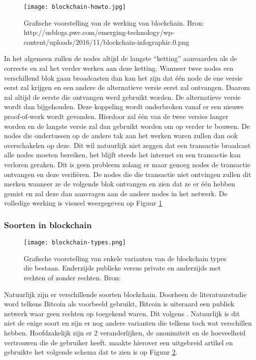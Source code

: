 \begin{figure}
	\texttt{[image: blockchain-howto.jpg]}
	\caption{Grafische voorstelling van de werking van blockchain. Bron: http://usblogs.pwc.com/emerging-technology/wp-content/uploads/2016/11/blockchain-infographic.0.png}
	\label{fig:blockchain-howto}
\end{figure}

In het algemeen zullen de nodes altijd de langste ``ketting'' aanvaarden als de correcte en zal het verder werken aan deze ketting. Wanneer twee nodes een verschillend blok gaan broadcasten dan kan het zijn dat één node de ene versie eerst zal krijgen en een andere de alternatieve versie eerst zal ontvangen. Daarom zal altijd de eerste die ontvangen werd gebruikt worden. De alternatieve versie wordt dan bijgehouden. Deze koppeling wordt onderbroken vanaf er een nieuwe proof-of-work wordt gevonden. Hierdoor zal één van de twee versies langer worden en de langste versie zal dan gebruikt worden om op verder te bouwen. De nodes die ondertussen op de andere tak aan het werken waren zullen dan ook overschakelen op deze. Dit wil natuurlijk niet zeggen dat een transactie broadcast alle nodes moeten bereiken, het blijft steeds het internet en een transactie kan verloren geraken. Dit is geen probleem zolang er maar genoeg nodes de transactie ontvangen en deze verifiëren. De nodes die die transactie niet ontvingen zullen dit merken wanneer ze de volgende blok ontvangen en zien dat ze er één hebben gemist en zal deze dan aanvragen aan de andere nodes in het netwerk. De volledige werking is visueel weergegeven op Figuur \ref{fig:blockchain-howto}

\subsubsection{Soorten in blockchain}

\begin{figure}
	\texttt{[image: blockchain-types.png]}
	\caption{Grafische voorstelling van enkele varianten van de blockchain types die bestaan. Enderzijds publieke versus private en anderzijds met rechten of zonder rechten. Bron: \textcite{Kravchenko2016}}
	\label{fig:blockchain-types}
\end{figure}

Natuurlijk zijn er verschillende soorten blockchain. Doorheen de literatuurstudie word telkens Bitcoin als voorbeeld gebruikt, Bitcoin is uiteraard een publiek netwerk waar geen rechten op toegekend waren. Dit volgens \textcite{Nakamoto2008}. Natuurlijk is dit niet de enige soort en zijn er nog andere varianten die telkens toch wat verschillen hebben. Hoofdzakelijk zijn er 2 veranderlijken, de anonimiteit en de hoeveelheid vertrouwen die de gebruiker heeft. \textcite{Kravchenko2016} maakte hierover een uitgebreid artikel en gebruikte het volgende schema dat te zien is op Figuur \ref{fig:blockchain-types}.

